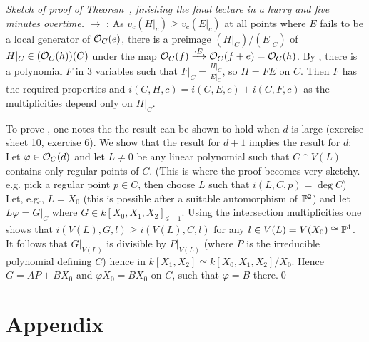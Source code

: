 \documentclass[a4paper,parskip=half,numbers=enddot, DIV=12]{scrreprt}
\begin{document}
\emph{Sketch of proof of Theorem~, finishing the final lecture in a hurry and five minutes overtime.}
 $\rightarrow$ :
As $v_c(H\vert_c) \geq v_c(E\vert_c)$ at all points where $E$ fails to be a local generator of
$\mathcal{O}_C(e)$, there is a preimage $(H\vert_C)/(E\vert_C)$
of $H\vert_C \in (\mathcal{O}_C(h))(C)$ under the map $\mathcal{O}_C(f)\xrightarrow{\cdot E} \mathcal{O}_C(f+e) = \mathcal{O}_C(h)$.
By , there is a polynomial $F$ in $3$ variables such that
$F\vert_C = \frac{H\vert_C}{E\vert_C}$, so $H=FE$ on $C$. Then $F$ has the required properties
and $i(C,H,c) = i(C,E,c) + i(C,F,c)$ as the multiplicities
depend only on $H\vert_C$.

To prove , one notes the the result can be shown to hold when $d$ is large (exercise sheet 10, exercise 6).
We show that the result for $d+1$ implies the result for $d$:
Let $\varphi\in \mathcal{O}_C(d)$
and let $L\neq 0$ be any linear polynomial such that $C\cap V(L)$ contains only regular points of $C$.
(This is where the proof becomes very sketchy. e.g. pick a regular point $p\in C$,
then choose $L$ such that $i(L,C,p)=\deg C$)
Let, e.g., $L=X_0$ (this is possible after a suitable automorphism of $\mathbb{P}^2$) and let $L\varphi = G\vert_C$ where
$G\in k[X_0,X_1,X_2]_{d+1}$. Using the intersection multiplicities one shows that $i(V(L),G,l)\geq i(V(L),C,l)$ for any $l\in V(L) = V(X_0)\cong \mathbb{P}^1$.
It follows that $G\vert_{V(L)}$ is divisible by $P\vert_{V(L)}$ (where $P$ is
the irreducible polynomial defining $C$) hence in $k[X_1,X_2] \simeq k[X_0,X_1,X_2]/X_0$. Hence
$G=AP+BX_0$ and $\varphi X_0=BX_0$ on $C$, such that $\varphi=B$ there.\qed





















\appendix
\chapter{Appendix}
\setcounter{thm}{0}
\renewcommand*{\thethm}{\Alph{thm}}
\end{document}

